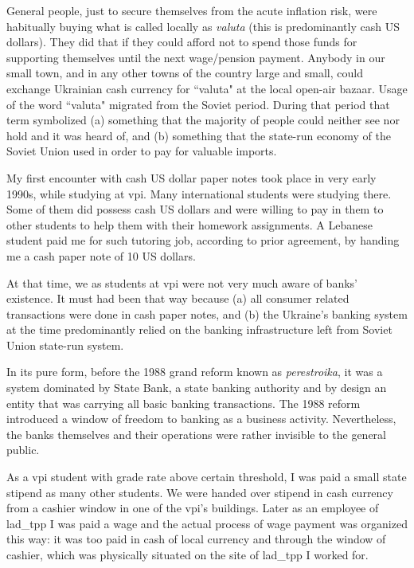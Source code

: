 General people, just to secure themselves from the acute inflation risk, were habitually buying what is called locally as \textit{valuta} (this is predominantly cash US dollars). They did that if they could afford not to spend those funds for supporting themselves until the next wage/pension payment. Anybody in our small town, and in any other towns of the country large and small, could exchange Ukrainian cash currency for ``valuta" at the local open-air bazaar. Usage of the word ``valuta" migrated from the Soviet period. During that period that term symbolized (a) something that the majority of people could neither see nor hold and it was heard of, and (b) something that the state-run economy of the Soviet Union used in order to pay for valuable imports.

My first encounter with cash US dollar paper notes took place in very early 1990s, while studying at \ac{vpi}. Many international students were studying there. Some of them did possess cash US dollars and were willing to pay in them to other students to help them with their homework assignments. A Lebanese student paid me for such tutoring job, according to prior agreement, by handing me a cash paper note of 10 US dollars. 

At that time, we as students at \ac{vpi} were not very much aware of banks' existence. It must had been that way because (a) all consumer related transactions were done in cash paper notes, and (b) the Ukraine's banking system at the time predominantly relied on the banking infrastructure left from Soviet Union state-run system. 

In its pure form, before the 1988 grand reform known as \textit{perestroika}, it was a system dominated by State Bank, a state banking authority and by design an entity that was carrying all basic banking transactions. The 1988 reform introduced a window of freedom to banking as a business activity. Nevertheless, the banks themselves and their operations were rather invisible to the general public. 

As a \ac{vpi} student with grade rate above certain threshold, I was paid a small state stipend as many other students. We were handed over stipend in cash currency from a cashier window in one of the \ac{vpi}'s buildings. Later as an employee of \ac{lad_tpp} I was paid a wage and the actual process of wage payment was organized this way: it was too paid in cash of local currency and through the window of cashier, which was physically situated on the site of \ac{lad_tpp} I worked for. 


